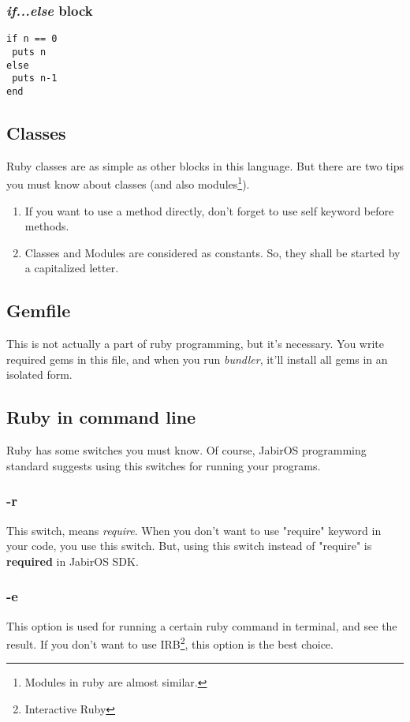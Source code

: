 \documentclass[11pt]{article}
\begin{document}
\subsubsection{\textit{if...else} block}

\begin{verbatim}
if n == 0
 puts n
else
 puts n-1
end
\end{verbatim}

\subsection{Classes}
Ruby classes are as simple as other blocks in this language. But there are two tips you must know about classes (and also modules\footnote{Modules in ruby are almost similar. }). 
\begin{enumerate}
\item If you want to use a method directly, don't forget to use self keyword before methods.
\item Classes and Modules are considered as constants. So, they shall be started by a capitalized letter.
\end{enumerate}

\subsection{Gemfile}
This is not actually a part of ruby programming, but it's necessary. You write required gems in this file, and when you run \textit{bundler}, it'll install all gems in an isolated form. 
\subsection{Ruby in command line}
Ruby has some switches you must know. Of course, JabirOS programming standard suggests using this switches for running your programs. 
\subsubsection{-r}
This switch, means \textit{require}. When you don't want to use "require" keyword in your code, you use this switch. But, using this switch instead of "require" is \textbf{required} in JabirOS SDK. 
\subsubsection{-e}
This option is used for running a certain ruby command in terminal, and see the result. If you don't want to use IRB\footnote{Interactive Ruby}, this option is the best choice. 
\end{document}
